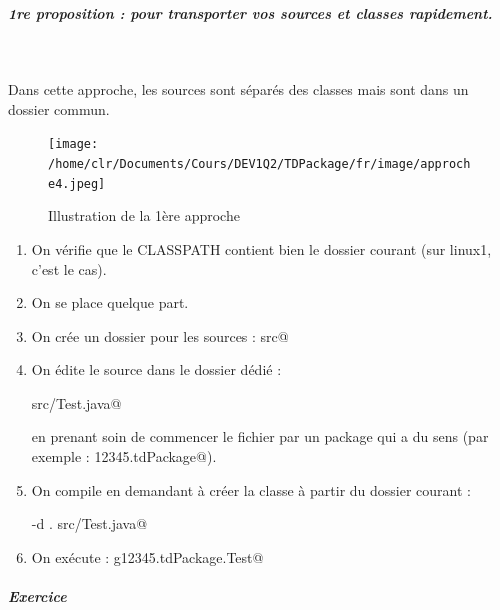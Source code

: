 \documentclass[11pt,a4paper]{article}
\begin{document}
			
		\subparagraph{1re proposition : pour transporter vos sources et classes rapidement.} 
		
					\textcolor{white}{.} \par
				
            \par
        
				Dans cette approche, les sources sont s\'epar\'es des classes
				mais sont dans un dossier commun.
			
            \par
        \begin{figure}[hbt]
				    \begin{center}
					\texttt{[image: /home/clr/Documents/Cours/DEV1Q2/TDPackage/fr/image/approche4.jpeg]}
						\end{center}
                
                    \caption[Illustration de la 1\`ere approche]{Illustration de la 1\`ere approche}
                \end{figure}
                    
					\begin{enumerate}
				
			\item 
					On v\'erifie que le CLASSPATH contient bien le 
					dossier courant (sur linux1, c'est le cas).
				
			\item 
					On se place quelque part.
				
			\item 
					On cr\'ee un dossier pour les sources : \verb@mkdir src@
			\item 
					On \'edite le source dans le dossier d\'edi\'e : 
					\par
				\verb@nano src/Test.java@\par
				
					en prenant soin de commencer le fichier par un package qui a du sens
					(par exemple : \verb@g12345.tdPackage@).
				
			\item 
					On compile en demandant \`a cr\'eer la classe \`a partir
					du dossier courant : 
					\par
				\verb@javac -d . src/Test.java@
			\item 
					On ex\'ecute : \verb@java g12345.tdPackage.Test@
					\end{enumerate}
				
			
		\subparagraph{Exercice} 
		
\end{document}
